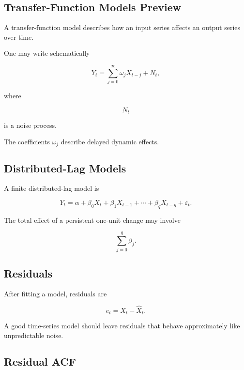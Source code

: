 \subsection{Transfer-Function Models Preview}
\label{subsec:transfer-function-models}

A transfer-function model describes how an input series affects an output
series over time.

One may write schematically

\[
\boxed{
Y_t
=
\sum_{j=0}^{\infty}
\omega_j
X_{t-j}
+
N_t,
}
\]

where

\[
N_t
\]

is a noise process.

The coefficients \(\omega_j\) describe delayed dynamic effects.

\subsection{Distributed-Lag Models}
\label{subsec:distributed-lag-models}

A finite distributed-lag model is

\[
\boxed{
Y_t
=
\alpha
+
\beta_0X_t
+
\beta_1X_{t-1}
+
\cdots
+
\beta_qX_{t-q}
+
\varepsilon_t.
}
\]

The total effect of a persistent one-unit change may involve

\[
\boxed{
\sum_{j=0}^{q}\beta_j.
}
\]

\subsection{Residuals}
\label{subsec:time-series-residuals}

After fitting a model, residuals are

\[
\boxed{
e_t
=
X_t-\widehat{X}_t.
}
\]

A good time-series model should leave residuals that behave approximately
like unpredictable noise.

\subsection{Residual ACF}
\label{subsec:residual-acf}

